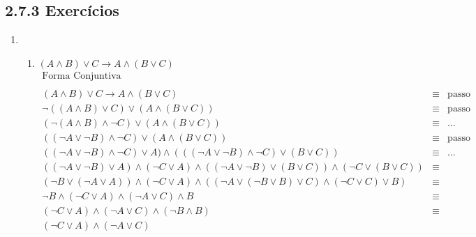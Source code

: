 \subsection{2.7.3 Exerc\'icios}
	\begin{enumerate}
		\item
			\begin{enumerate}
				\item $(A\land B)\lor C\rightarrow A\land(B\lor C)$
					\[
						\begin{array}{lcl}
						\text{Forma Conjuntiva} & & \\
						&&\\
						(A\land B)\lor C\rightarrow A\land(B\lor C) & \equiv & \text{passo 2}\\
						
						\neg ((A \land B)\lor C) \lor (A \land (B \lor C))& \equiv & \text{passo 3}\\
						
						
						(\neg (A \land B) \land \neg C) \lor (A \land (B \lor C)) & \equiv & \ldots \\
						
						
						((\neg A \lor \neg B) \land \neg C) \lor (A \land (B \lor C)) & \equiv & \text{passo 5}\\
						
						((\neg A \lor \neg B) \land \neg C) \lor A) \land (((\neg A \lor \neg B) \land \neg C) \lor (B \lor C)) & \equiv & \ldots \\
						
						((\neg A \lor \neg B) \lor A) \land (\neg C \lor A) \land ((\neg A \lor \neg B) \lor (B \lor C)) \land (\neg C \lor (B \lor C)) & \equiv & \\
						
						(\neg B \lor (\neg A \lor A)) \land (\neg C \lor A) \land ((\neg A \lor (\neg B \lor B) \lor C) \land (\neg C \lor C)\lor B) & \equiv &  \\
						
						\neg B \land (\neg C \lor A) \land (\neg A \lor C) \land B & \equiv &  \\
						
						(\neg C \lor A) \land (\neg A \lor C) \land (\neg B \land B) & \equiv &  \\
						
						(\neg C \lor A) \land (\neg A \lor C) &  & \\
						
						& & \\
						

\end{array}\]
\end{enumerate}
\end{enumerate}
